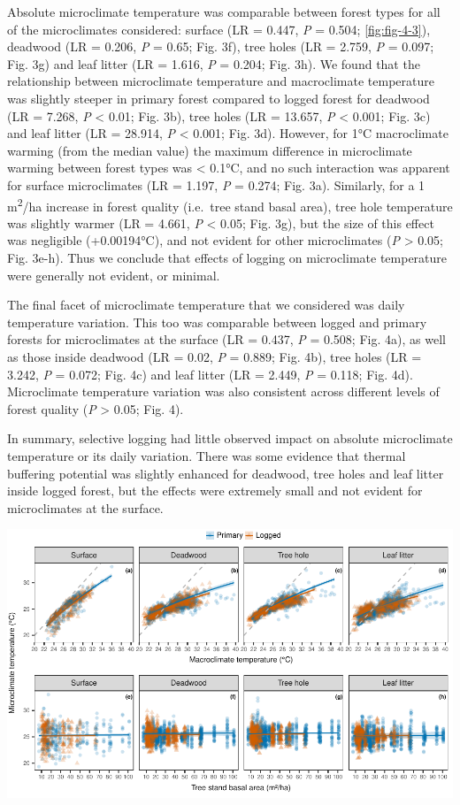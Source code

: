 \documentclass[12pt,a4paper,]{report}
\theoremstyle{definition}
\theoremstyle{definition}
\theoremstyle{definition}
\theoremstyle{remark}
\begin{document}
Absolute microclimate temperature was comparable between forest types
for all of the microclimates considered: surface (LR = 0.447, \emph{P} =
0.504; \autoref{fig:fig-4-3}), deadwood (LR = 0.206, \emph{P} = 0.65;
Fig. 3f), tree holes (LR = 2.759, \emph{P} = 0.097; Fig. 3g) and leaf
litter (LR = 1.616, \emph{P} = 0.204; Fig. 3h). We found that the
relationship between microclimate temperature and macroclimate
temperature was slightly steeper in primary forest compared to logged
forest for deadwood (LR = 7.268, \emph{P} \textless{} 0.01; Fig. 3b),
tree holes (LR = 13.657, \emph{P} \textless{} 0.001; Fig. 3c) and leaf
litter (LR = 28.914, \emph{P} \textless{} 0.001; Fig. 3d). However, for
1°C macroclimate warming (from the median value) the maximum difference
in microclimate warming between forest types was \textless{} 0.1°C, and
no such interaction was apparent for surface microclimates (LR = 1.197,
\emph{P} = 0.274; Fig. 3a). Similarly, for a 1 m\textsuperscript{2}/ha
increase in forest quality (i.e.~tree stand basal area), tree hole
temperature was slightly warmer (LR = 4.661, \emph{P} \textless{} 0.05;
Fig. 3g), but the size of this effect was negligible (+0.00194°C), and
not evident for other microclimates (\emph{P} \textgreater{} 0.05; Fig.
3e-h). Thus we conclude that effects of logging on microclimate
temperature were generally not evident, or minimal.

The final facet of microclimate temperature that we considered was daily
temperature variation. This too was comparable between logged and
primary forests for microclimates at the surface (LR = 0.437, \emph{P} =
0.508; Fig. 4a), as well as those inside deadwood (LR = 0.02, \emph{P} =
0.889; Fig. 4b), tree holes (LR = 3.242, \emph{P} = 0.072; Fig. 4c) and
leaf litter (LR = 2.449, \emph{P} = 0.118; Fig. 4d). Microclimate
temperature variation was also consistent across different levels of
forest quality (\emph{P} \textgreater{} 0.05; Fig. 4).

In summary, selective logging had little observed impact on absolute
microclimate temperature or its daily variation. There was some evidence
that thermal buffering potential was slightly enhanced for deadwood,
tree holes and leaf litter inside logged forest, but the effects were
extremely small and not evident for microclimates at the surface.

\begin{center}\includegraphics{./output/fig-4-3-1} \end{center}
\end{document}
